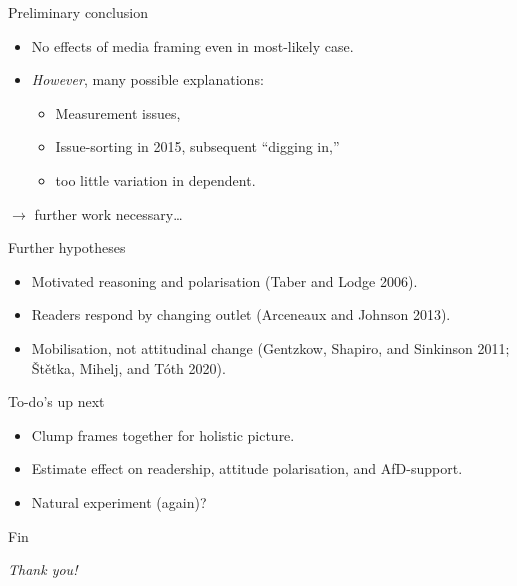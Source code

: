 \documentclass[
  ignorenonframetext,
]{beamer}
\providecommand{\tightlist}{%
  \setlength{\itemsep}{0pt}\setlength{\parskip}{0pt}}
\begin{document}
\begin{frame}{Preliminary conclusion}
\protect\hypertarget{preliminary-conclusion}{}
\begin{itemize}
\tightlist
\item
  No effects of media framing even in most-likely case.
\item
  \emph{However}, many possible explanations:

  \begin{itemize}
  \tightlist
  \item
    Measurement issues,
  \item
    Issue-sorting in 2015, subsequent ``digging in,''
  \item
    too little variation in dependent.
  \end{itemize}
\end{itemize}

\(\rightarrow\) further work necessary\ldots{}
\end{frame}

\begin{frame}{Further hypotheses}
\protect\hypertarget{further-hypotheses}{}
\begin{itemize}
\tightlist
\item
  Motivated reasoning and polarisation (Taber and Lodge 2006).
\item
  Readers respond by changing outlet (Arceneaux and Johnson 2013).
\item
  Mobilisation, not attitudinal change (Gentzkow, Shapiro, and Sinkinson
  2011; Štětka, Mihelj, and Tóth 2020).
\end{itemize}
\end{frame}

\begin{frame}{To-do's up next}
\protect\hypertarget{to-dos-up-next}{}
\begin{itemize}
\tightlist
\item
  Clump frames together for holistic picture.
\item
  Estimate effect on readership, attitude polarisation, and AfD-support.
\item
  Natural experiment (again)?
\end{itemize}
\end{frame}

\begin{frame}{Fin}
\protect\hypertarget{fin}{}
\centering

\emph{Thank you!}
\end{frame}
\end{document}
